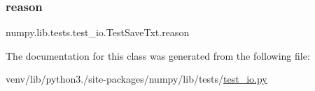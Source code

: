 \subsubsection{\texorpdfstring{reason}{reason}}
{\footnotesize\ttfamily numpy.\+lib.\+tests.\+test\+\_\+io.\+Test\+Save\+Txt.\+reason\hspace{0.3cm}{\ttfamily [static]}}



The documentation for this class was generated from the following file\+:\begin{DoxyCompactItemize}
\item 
venv/lib/python3./site-\/packages/numpy/lib/tests/\hyperlink{test__io_8py}{test\+\_\+io.\+py}\end{DoxyCompactItemize}
